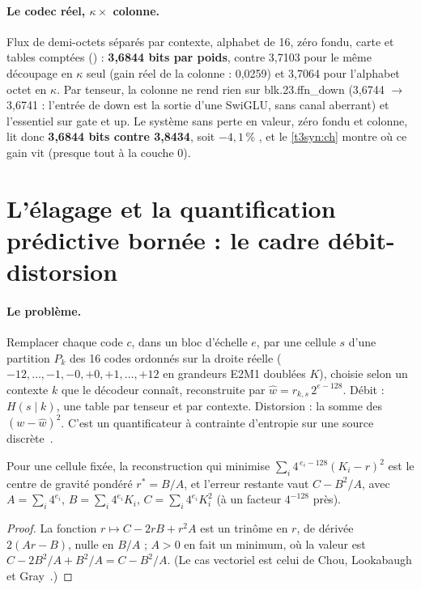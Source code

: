 \paragraph{Le codec réel, $\kappa \times$ colonne.} Flux de demi-octets séparés par contexte, alphabet de 16, zéro fondu, carte et tables comptées () \mes : \textbf{3,6844 bits par poids}, contre 3,7103 pour le même découpage en $\kappa$ seul (gain réel de la colonne : 0,0259) et 3,7064 pour l'alphabet octet en $\kappa$. Par tenseur, la colonne ne rend rien sur blk.23.ffn\_down (3,6744 $\to$ 3,6741 : l'entrée de down est la sortie d'une SwiGLU, sans canal aberrant) et l'essentiel sur gate et up. Le système sans perte en valeur, zéro fondu et colonne, lit donc \textbf{3,6844 bits contre 3,8434}, soit $-4{,}1\,\%$ \calc, et le \cref{t3syn:ch} montre où ce gain vit (presque tout à la couche 0).

\section{L'élagage et la quantification prédictive bornée : le cadre débit-distorsion}\label{t3pre:sec:cadre}

\paragraph{Le problème.} Remplacer chaque code $c$, dans un bloc d'échelle $e$, par une cellule $s$ d'une partition $P_k$ des 16 codes ordonnés sur la droite réelle ($-12, \ldots, -1, -0, +0, +1, \ldots, +12$ en grandeurs E2M1 doublées $K$), choisie selon un contexte $k$ que le décodeur connaît, reconstruite par $\hat w = r_{k,s}\, 2^{e-128}$. Débit : $H(s \mid k)$, une table par tenseur et par contexte. Distorsion : la somme des $(w - \hat w)^2$. C'est un quantificateur à contrainte d'entropie sur une source discrète~\cite{genome-pe-chou1989ecvq,genome-pe-farvardin1984}.

\begin{lemme}\label{t3pre:lem:centre}
Pour une cellule fixée, la reconstruction qui minimise $\sum_i 4^{\,e_i - 128}(K_i - r)^2$ est le centre de gravité pondéré $r^\ast = B/A$, et l'erreur restante vaut $C - B^2/A$, avec $A = \sum_i 4^{e_i}$, $B = \sum_i 4^{e_i} K_i$, $C = \sum_i 4^{e_i} K_i^2$ (à un facteur $4^{-128}$ près).
\end{lemme}

\begin{proof}
La fonction $r \mapsto C - 2rB + r^2 A$ est un trinôme en $r$, de dérivée $2(Ar - B)$, nulle en $B/A$ ; $A > 0$ en fait un minimum, où la valeur est $C - 2B^2/A + B^2/A = C - B^2/A$. (Le cas vectoriel est celui de Chou, Lookabaugh et Gray~\cite{genome-pe-chou1989ecvq}.)
\end{proof}

